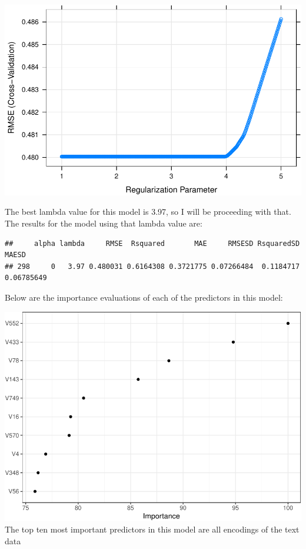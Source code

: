 \documentclass[
  man,floatsintext]{apa6}
\begin{document}
\includegraphics{Final_Eliott_files/figure-latex/unnamed-chunk-20-1.pdf}

The best lambda value for this model is 3.97, so I will be proceeding with that. The results for the model using that lambda value are:

\begin{verbatim}
##     alpha lambda     RMSE  Rsquared       MAE     RMSESD RsquaredSD      MAESD
## 298     0   3.97 0.480031 0.6164308 0.3721775 0.07266484  0.1184717 0.06785649
\end{verbatim}

Below are the importance evaluations of each of the predictors in this model:

\includegraphics{Final_Eliott_files/figure-latex/unnamed-chunk-23-1.pdf}
The top ten most important predictors in this model are all encodings of the text data
\end{document}
